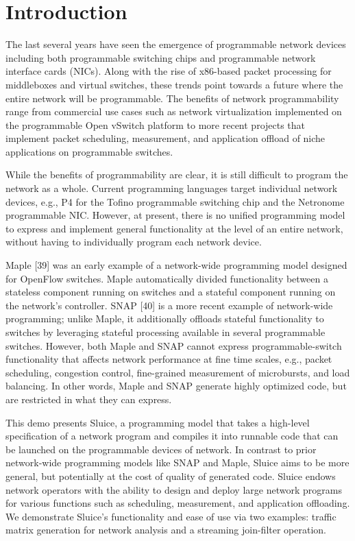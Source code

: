 \section{Introduction}
The last several years have seen the emergence of programmable network devices
including both programmable switching chips and programmable network interface
cards (NICs). Along with the rise of x86-based packet processing for
middleboxes and virtual switches, these trends point towards a future where the
entire network will be programmable. The benefits of network programmability
range from commercial use cases such as network virtualization implemented on
the programmable Open vSwitch platform to more recent projects that implement
packet scheduling, measurement, and application offload of niche applications
on programmable switches.

While the benefits of programmability are clear, it is still difficult to
program the network as a whole. Current programming languages target individual
network devices, e.g., P4 for the Tofino programmable switching chip and the
Netronome programmable NIC. However, at present, there is no unified
programming model to express and implement general functionality at the level
of an entire network, without having to individually program each network
device.

Maple [39] was an early example of a network-wide programming model designed
for OpenFlow switches. Maple automatically divided functionality between a
stateless component running on switches and a stateful component running on the
network's controller. SNAP [40] is a more recent example of network-wide
programming; unlike Maple, it additionally offloads stateful functionality to
switches by leveraging stateful processing available in several programmable
switches. However, both Maple and SNAP cannot express programmable-switch
functionality that affects network performance at fine time scales, e.g.,
packet scheduling, congestion control, fine-grained measurement of microbursts,
and load balancing. In other words, Maple and SNAP generate highly optimized
code, but are restricted in what they can express.

This demo presents Sluice, a programming model that takes a high-level
specification of a network program and compiles it into runnable code that can
be launched on the programmable devices of network. In contrast to prior
network-wide programming models like SNAP and Maple, Sluice aims to be more
general, but potentially at the cost of quality of generated code.  Sluice
endows network operators with the ability to design and deploy large network
programs for various functions such as scheduling, measurement, and application
offloading.  We demonstrate Sluice's functionality and ease of use via two
examples: traffic matrix generation for network analysis and a streaming
join-filter operation.

